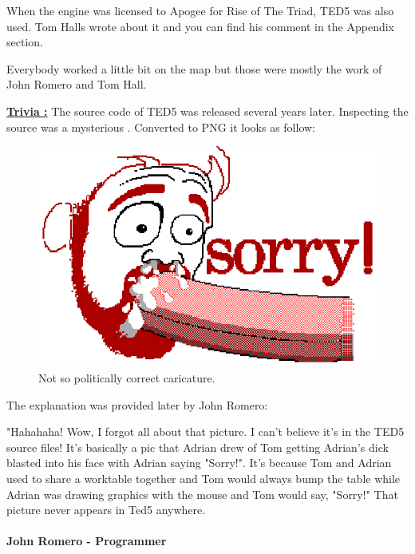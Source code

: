 \documentclass[book.tex]{subfiles}
\begin{document}
When the engine was licensed to Apogee for Rise of The Triad, TED5 was also used. Tom Halls wrote about it and you can find his comment in the Appendix section.
\par
Everybody worked a little bit on the map but those were mostly the work of John Romero and Tom Hall.\\
\par
 \textbf{\underline{Trivia :}} The source code of TED5 was released several years later. Inspecting the source was a mysterious . Converted to PNG it looks as follow:\\
\begin{figure}[H]
\centering
 \includegraphics[width=\textwidth]{imgs/_tom.eps}
 \caption{Not so politically correct caricature.} 
 \end{figure}
The explanation was provided later by John Romero:\\
 \begin{fancyquotes}
   "Hahahaha! Wow, I forgot all about that picture. I can't believe it's 
in the TED5 source files! It's basically a pic that Adrian drew of Tom 
getting Adrian's dick blasted into his face with Adrian saying "Sorry!". 
It's because Tom and Adrian used to share a worktable together and Tom 
would always bump the table while Adrian was drawing graphics with the 
mouse and Tom would say, "Sorry!" That picture never appears in Ted5 
anywhere.\\
   \\
\textbf{John Romero - Programmer}
 \end{fancyquotes}\\
\end{document}
